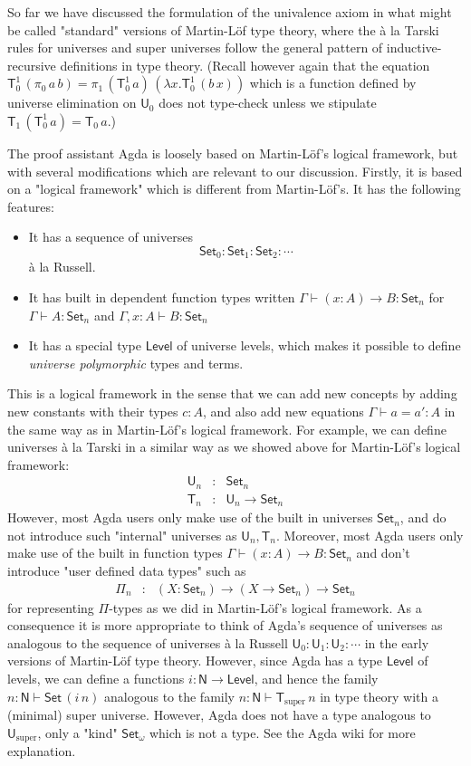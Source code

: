 \documentclass[11pt,a4paper]{article}
\def\UU{\mathsf{U}}
\def\Level{\mathsf{Level}}
\newcommand{\N}{\mathsf{N}}
\newcommand{\Set}{\mathsf{Set}}
\newcommand{\U}{\mathsf{U}}
\newcommand{\T}{\mathsf{T}}
\newcommand{\Usuper}{\U_{\mathrm{super}}}
\newcommand{\Tsuper}{\T_{\mathrm{super}}}
\begin{document}
So far we have discussed the formulation of the univalence axiom in what might be called "standard" versions of Martin-Löf type theory, where the \`a la Tarski rules for universes and super universes follow the general pattern of inductive-recursive definitions in type theory. (Recall however again that the equation 
$
\T_0^1\, (\pi_0\,a\, b) = \pi_1\,(\T_0^1\,a)\,(\lambda x.\T_0^1\,(b\,x))
$
which is a function defined by universe elimination on $\U_0$ does not type-check unless we stipulate $\T_1\, (\T_0^1\, a) = \T_0\, a$.)


The proof assistant Agda is loosely based on Martin-Löf's logical framework, but with several modifications which are relevant to our discussion. Firstly, it is based on a "logical framework" which is different from Martin-Löf's. It has the following features:
\begin{itemize}
\item It has a sequence of universes  $$\Set_0 : \Set_1 : \Set_2 : \cdots$$  \`a la Russell.
\item It has built in dependent function types written $\Gamma \vdash (x : A)\to B : \Set_n$ for $\Gamma \vdash A : \Set_n$ and $\Gamma , x : A \vdash B : \Set_n$
\item It has a special type $\Level$ of universe levels, which makes it possible to define {\em universe polymorphic} types and terms. 
\end{itemize}
This is a logical framework in the sense that we can add new concepts by adding new constants with their types $c : A$, and also add new equations $\Gamma \vdash a = a' : A$ in the same way as in Martin-Löf's logical framework. For example, we can define universes \`a la Tarski in a similar way as we showed above for Martin-Löf's logical framework:
\begin{eqnarray*}
\U_n &: &\Set_n\\
\T_n &:& \U_n \to \Set_n
\end{eqnarray*}
However, most Agda users only make use of the built in universes $\Set_n$, and do not introduce such "internal" universes as $\UU_n, \T_n$. Moreover, most Agda users only make use of the built in function types $\Gamma \vdash (x : A)\to B : \Set_n$ and don't introduce "user defined data types" such as
\begin{eqnarray*}
\Pi_n &:& (X:\Set_n) \to (X \to \Set_n) \to \Set_n
\end{eqnarray*}
for representing $\Pi$-types as we did in Martin-Löf's logical framework. As a consequence it is more appropriate to think of Agda's sequence of universes as analogous to the sequence of universes  \`a la Russell $ \UU_0 : \UU_1 : \UU_2 : \cdots$ in the early versions of Martin-Löf type theory. However, since Agda has a type $\Level$ of levels, we can define a functions $i : \N \to \Level$, and hence the family $n : \N \vdash \Set\, (i\, n)$ analogous to the family $n : \N \vdash \Tsuper\,n$ in type theory with a (minimal) super universe. However, Agda does not have a type analogous to $\Usuper$, only a "kind" $\Set_\omega$ which is not a type. See the Agda wiki for more explanation.
\end{document}
